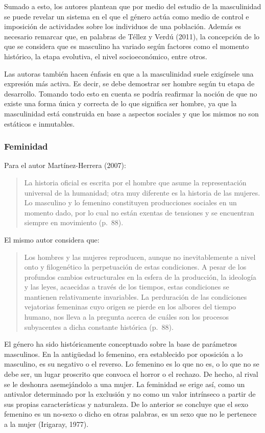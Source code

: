 Sumado a esto, los autores plantean que por medio del estudio de la masculinidad
se puede revelar un sistema en el que el género actúa como medio de control e
imposición de actividades sobre los individuos de una población.
Además es necesario remarcar que, en palabras de Téllez y Verdú (2011), la
concepción de lo que se considera que es masculino ha variado según factores
como el momento histórico, la etapa evolutiva, el nivel socioeconómico, entre
otros.

Las autoras también hacen énfasis en que a la masculinidad suele exigírsele una
expresión más activa.
Es decir, se debe demostrar ser hombre según tu etapa de desarrollo.
Tomando todo esto en cuenta se podría reafirmar la noción de que no existe una
forma única y correcta de lo que significa ser hombre, ya que la masculinidad
está construida en base a aspectos sociales y que los mismos no son estáticos e
inmutables.

\subsubsection{Feminidad}
Para el autor Martínez-Herrera (2007):

\begin{quote}
    La historia oficial es escrita por el hombre que asume la representación
    universal de la humanidad;
    otra muy diferente es la historia de las mujeres.
    Lo masculino y lo femenino constituyen producciones sociales en un momento dado,
    por lo cual no están exentas de tensiones y se encuentran siempre en movimiento
    (p.~88).
\end{quote}

El mismo autor considera que:

\begin{quote}
    Los hombres y las mujeres reproducen, aunque no inevitablemente a nivel onto y
    filogenético la perpetuación de estas condiciones.
    A pesar de los profundos cambios estructurales en la esfera de la producción, la
    ideología y las leyes, acaecidas a través de los tiempos, estas condiciones se
    mantienen relativamente invariables.
    La perduración de las condiciones vejatorias femeninas cuyo origen se pierde
    en los albores del tiempo humano, nos lleva a la pregunta acerca de cuáles son
    los procesos subyacentes a dicha constante histórica (p.~88).
\end{quote}

El género ha sido históricamente conceptuado sobre la base de parámetros
masculinos.
En la antigüedad lo femenino, era establecido por oposición a lo masculino, es
su negativo o el reverso.
Lo femenino es lo que no es, o lo que no se debe ser, un lugar proscrito que
convoca el horror o el rechazo.
De hecho, al rival se le deshonra asemejándolo a una mujer.
La feminidad se erige así, como un antivalor determinado por la exclusión y no
como un valor intrínseco a partir de sus propias características y naturaleza.
De lo anterior se concluye que el sexo femenino es un no-sexo o dicho en otras
palabras, es un sexo que no le pertenece a la mujer (Irigaray, 1977).


